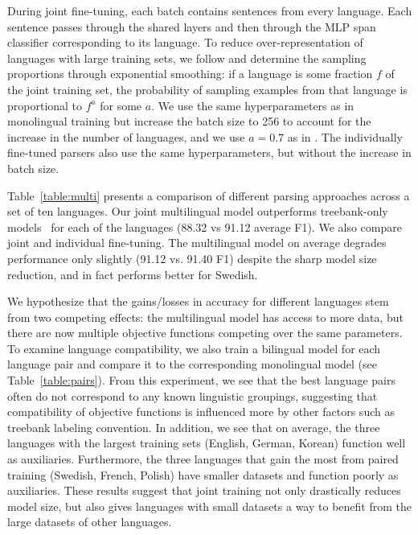 \documentclass[11pt,a4paper]{article}
\begin{document}
During joint fine-tuning, each batch contains sentences from every language. Each sentence passes through the shared layers and then through the MLP span classifier corresponding to its language.
To reduce over-representation of languages with large training sets, we follow \citet{devlin_github_2018} and determine the sampling proportions through exponential smoothing:
if a language is some fraction $f$ of the joint training set, the probability of sampling examples from that language is proportional to $f^a$ for some $a$.
We use the same hyperparameters as in monolingual training but increase the batch size to 256 to account for the increase in the number of languages, and we use $a = 0.7$ as in \citet{devlin_github_2018}. The individually fine-tuned parsers also use the same hyperparameters, but without the increase in batch size.

Table~\ref{table:multi} presents a comparison of different parsing approaches across a set of ten languages. Our joint multilingual model outperforms treebank-only models~\citep{kitaev_2018_self_attentive} for each of the languages (88.32 vs 91.12 average F1). We also compare joint and individual fine-tuning. The multilingual model on average degrades performance only slightly (91.12 vs. 91.40 F1) despite the sharp model size reduction, and in fact performs better for Swedish.

We hypothesize that the gains/losses in accuracy for different languages stem from two competing effects: the multilingual model has access to more data, but there are now multiple objective functions competing over the same parameters. To examine language compatibility, we also train a bilingual model for each language pair and compare it to the corresponding monolingual model (see Table~\ref{table:pairs}). From this experiment, we see that the best language pairs often do not correspond to any known linguistic groupings, suggesting that compatibility of objective functions is influenced more by other factors such as treebank labeling convention. In addition, we see that on average, the three languages with the largest training sets (English, German, Korean) function well as auxiliaries. Furthermore, the three languages that gain the most from paired training (Swedish, French, Polish) have smaller datasets and function poorly as auxiliaries. These results suggest that joint training not only drastically reduces model size, but also gives languages with small datasets a way to benefit from the large datasets of other languages.
\end{document}
